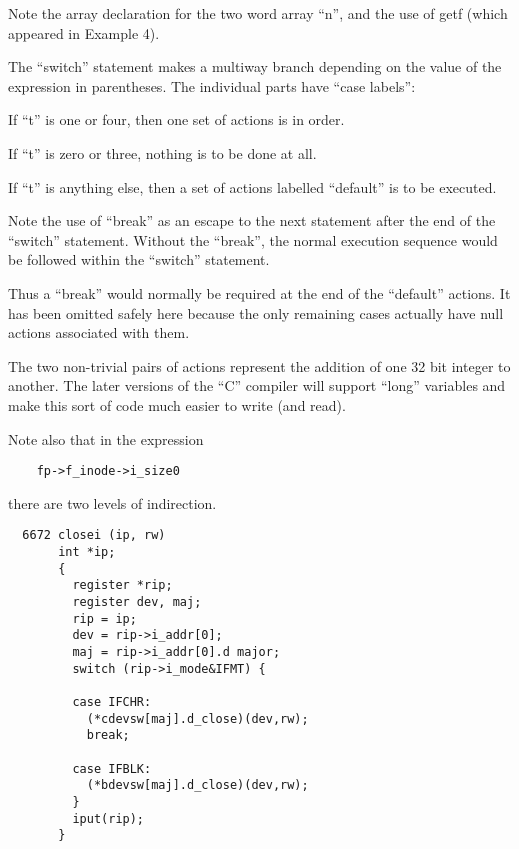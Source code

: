 Note the array declaration for the two
word array ``n'', and the use of getf
(which appeared in Example 4).

The ``switch'' statement makes a multiway branch depending on the value of
the expression in parentheses. The
individual parts have ``case labels'':

\bi
\item If ``t'' is one or  four,  then  one
set of actions is in order.

\item If ``t'' is zero or  three,  nothing
is to be done at all.

\item If ``t'' is anything  else,  then  a
set  of actions labelled ``default''
is to be executed.
\ei

Note the use of ``break'' as an escape to
the next statement after the end of the
``switch''   statement.    Without    the
``break'',  the normal execution sequence
would be followed within  the  ``switch''
statement.

Thus  a  ``break''  would   normally   be
required  at  the  end of the ``default''
actions.  It has  been  omitted  safely
here  because  the only remaining cases
actually have null  actions  associated
with them.

The two non-trivial  pairs  of  actions
represent  the  addition  of one 32 bit
integer to another.  The later versions
of the ``C'' compiler will support ``long''
variables and make this  sort  of  code
much easier to write (and read).


Note also that in the expression

\begin{verbatim}
    fp->f_inode->i_size0
\end{verbatim}

\noindent there are two levels of indirection.


\begin{verbatim}
  6672 closei (ip, rw)
       int *ip;
       {
         register *rip;
         register dev, maj;
         rip = ip;
         dev = rip->i_addr[0];
         maj = rip->i_addr[0].d major;
         switch (rip->i_mode&IFMT) {

         case IFCHR:
           (*cdevsw[maj].d_close)(dev,rw);
           break;
         
         case IFBLK:
           (*bdevsw[maj].d_close)(dev,rw);
         }
         iput(rip);
       }
\end{verbatim}

